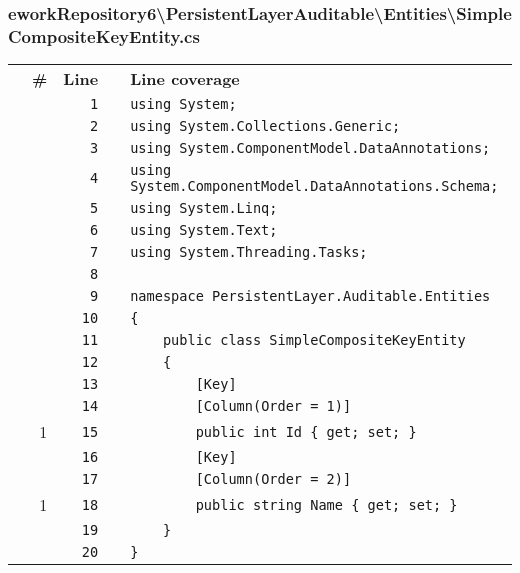 \documentclass[a4paper,10pt]{article}
\begin{document}
\subsubsection{eworkRepository6\textbackslash PersistentLayerAuditable\textbackslash Entities\textbackslash SimpleCompositeKeyEntity.cs}
\begin{longtable}[l]{lrrll}
\textbf{} & \textbf{\#} & \textbf{Line} & \textbf{} & \textbf{Line coverage}\\
\cellcolor{gray} &  & \verb~1~ & & \verb~using System;~\\
\cellcolor{gray} &  & \verb~2~ & & \verb~using System.Collections.Generic;~\\
\cellcolor{gray} &  & \verb~3~ & & \verb~using System.ComponentModel.DataAnnotations;~\\
\cellcolor{gray} &  & \verb~4~ & & \verb~using System.ComponentModel.DataAnnotations.Schema;~\\
\cellcolor{gray} &  & \verb~5~ & & \verb~using System.Linq;~\\
\cellcolor{gray} &  & \verb~6~ & & \verb~using System.Text;~\\
\cellcolor{gray} &  & \verb~7~ & & \verb~using System.Threading.Tasks;~\\
\cellcolor{gray} &  & \verb~8~ & & \verb~~\\
\cellcolor{gray} &  & \verb~9~ & & \verb~namespace PersistentLayer.Auditable.Entities~\\
\cellcolor{gray} &  & \verb~10~ & & \verb~{~\\
\cellcolor{gray} &  & \verb~11~ & & \verb~    public class SimpleCompositeKeyEntity~\\
\cellcolor{gray} &  & \verb~12~ & & \verb~    {~\\
\cellcolor{gray} &  & \verb~13~ & & \verb~        [Key]~\\
\cellcolor{gray} &  & \verb~14~ & & \verb~        [Column(Order = 1)]~\\
\cellcolor{green} & 1 & \verb~15~ & & \verb~        public int Id { get; set; }~\\
\cellcolor{gray} &  & \verb~16~ & & \verb~        [Key]~\\
\cellcolor{gray} &  & \verb~17~ & & \verb~        [Column(Order = 2)]~\\
\cellcolor{green} & 1 & \verb~18~ & & \verb~        public string Name { get; set; }~\\
\cellcolor{gray} &  & \verb~19~ & & \verb~    }~\\
\cellcolor{gray} &  & \verb~20~ & & \verb~}~\\
\end{longtable}
\newpage
\end{document}
